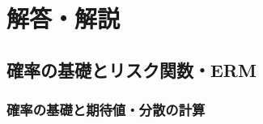 \documentclass[
  pandoc]{bxjsarticle}
\begin{document}
\section{解答・解説}\label{ux89e3ux7b54ux89e3ux8aac}

\subsection{確率の基礎とリスク関数・ERM}\label{ux78baux7387ux306eux57faux790eux3068ux30eaux30b9ux30afux95a2ux6570erm-1}

\subsubsection{確率の基礎と期待値・分散の計算}\label{ux78baux7387ux306eux57faux790eux3068ux671fux5f85ux5024ux5206ux6563ux306eux8a08ux7b97-1}
\end{document}
